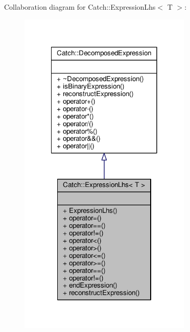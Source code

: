 Collaboration diagram for Catch\-:\-:Expression\-Lhs$<$ T $>$\-:
\nopagebreak
\begin{figure}[H]
\begin{center}
\leavevmode
\includegraphics[width=234pt]{class_catch_1_1_expression_lhs__coll__graph}
\end{center}
\end{figure}
